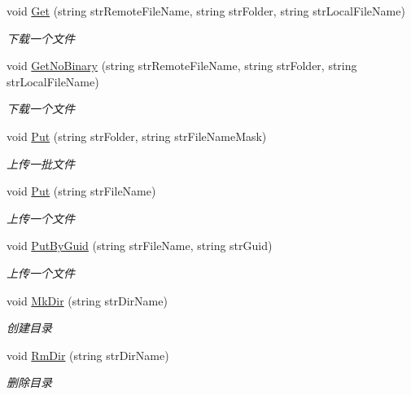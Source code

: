 \begin{DoxyCompactItemize}
void \hyperlink{class_x_c_l_net_tools_1_1_f_t_p_1_1_f_t_p_client_a87ce6305af9ccb5e04b0669bd0eac812}{Get} (string str\+Remote\+File\+Name, string str\+Folder, string str\+Local\+File\+Name)
\begin{DoxyCompactList}\small\item\em 下载一个文件 \end{DoxyCompactList}\item 
void \hyperlink{class_x_c_l_net_tools_1_1_f_t_p_1_1_f_t_p_client_a7648a7d3ce55e3332618aca711c3d6ea}{Get\+No\+Binary} (string str\+Remote\+File\+Name, string str\+Folder, string str\+Local\+File\+Name)
\begin{DoxyCompactList}\small\item\em 下载一个文件 \end{DoxyCompactList}\item 
void \hyperlink{class_x_c_l_net_tools_1_1_f_t_p_1_1_f_t_p_client_aa610dab6dd9699203f7d4da488b3ca20}{Put} (string str\+Folder, string str\+File\+Name\+Mask)
\begin{DoxyCompactList}\small\item\em 上传一批文件 \end{DoxyCompactList}\item 
void \hyperlink{class_x_c_l_net_tools_1_1_f_t_p_1_1_f_t_p_client_a0ce0fbef1a6c4a2c872315c104f8fd62}{Put} (string str\+File\+Name)
\begin{DoxyCompactList}\small\item\em 上传一个文件 \end{DoxyCompactList}\item 
void \hyperlink{class_x_c_l_net_tools_1_1_f_t_p_1_1_f_t_p_client_a9f333aedd5467c2fdc46d33298dc9dbb}{Put\+By\+Guid} (string str\+File\+Name, string str\+Guid)
\begin{DoxyCompactList}\small\item\em 上传一个文件 \end{DoxyCompactList}\item 
void \hyperlink{class_x_c_l_net_tools_1_1_f_t_p_1_1_f_t_p_client_aaf6ecfb2034736ffe5f88945ec873efe}{Mk\+Dir} (string str\+Dir\+Name)
\begin{DoxyCompactList}\small\item\em 创建目录 \end{DoxyCompactList}\item 
void \hyperlink{class_x_c_l_net_tools_1_1_f_t_p_1_1_f_t_p_client_a4c4167a6afd00ed6e1f5303e59555037}{Rm\+Dir} (string str\+Dir\+Name)
\begin{DoxyCompactList}\small\item\em 删除目录 \end{DoxyCompactList}\item 

\end{DoxyCompactItemize}
